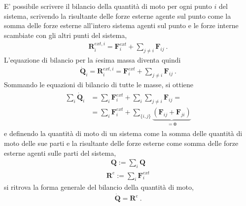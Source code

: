 \documentclass[letterpaper,10pt,english]{jupyterBook}
\begin{document}
\sphinxAtStartPar
{}
E’ possibile scrivere il bilancio della quantità di moto per ogni punto \(i\) del sistema, scrivendo la risultante delle forze esterne agente sul punto come la somma delle forze esterne all’intero sistema agenti sul punto e le forze interne scambiate con gli altri punti del sistema,
\begin{equation*}
\begin{split}\mathbf{R}_i^{ext,i} = \mathbf{F}_i^{ext} + \sum_{j \ne i} \mathbf{F}_{ij} \ .\end{split}
\end{equation*}
\sphinxAtStartPar
L’equazione di bilancio per la \(i\)\sphinxhyphen{}esima massa diventa quindi
\begin{equation*}
\begin{split}\dot{\mathbf{Q}}_i = \mathbf{R}_i^{ext,i} = \mathbf{F}_i^{ext} + \sum_{j \ne i} \mathbf{F}_{ij} \ .\end{split}
\end{equation*}
\sphinxAtStartPar
Sommando le equazioni di bilancio di tutte le masse, si ottiene
\begin{equation*}
\begin{split}\begin{aligned}
\sum_{i} \dot{\mathbf{Q}}_i & = \sum_i \mathbf{F}_{i}^{ext} + \sum_i \sum_{j \ne i} \mathbf{F}_{ij} = \\
                            & = \sum_i \mathbf{F}_{i}^{ext} + \sum_{\{i,j\}} \underbrace{\left( \mathbf{F}_{ij} + \mathbf{F}_{ji} \right)}_{=\mathbf{0}} 
\end{aligned}\end{split}
\end{equation*}
\sphinxAtStartPar
e definendo la quantità di moto di un sistema come la somma delle quantità di moto delle sue parti e la risultante delle forze esterne come somma delle forze esterne agenti sulle parti del sistema,
\begin{equation*}
\begin{split}\mathbf{Q} := \sum_i \mathbf{Q}\end{split}
\end{equation*}\begin{equation*}
\begin{split}\mathbf{R}^e := \sum_i \mathbf{F}_i^{ext}\end{split}
\end{equation*}
\sphinxAtStartPar
si ritrova la forma generale del bilancio della quantità di moto,
\begin{equation*}
\begin{split}\dot{\mathbf{Q}} = \mathbf{R}^e \ .\end{split}
\end{equation*}
\end{document}

